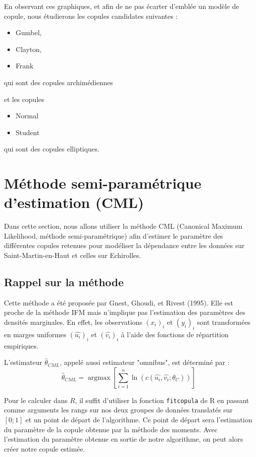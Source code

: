 En observant ces graphiques, et afin de ne pas écarter d'emblée un modèle de copule, nous étudierons les copules candidates suivantes :
\begin{itemize}
\item Gumbel,
\item Clayton,
\item Frank 
\end{itemize}
qui sont des copules archimédiennes 

et les copules
\begin{itemize} 
\item Normal
\item Student
\end{itemize}
qui sont des copules elliptiques.





\section{Méthode semi-paramétrique d'estimation (CML)}

Dans cette section, nous allons utiliser la méthode CML (Canonical Maximum Likelihood, méthode semi-paramétrique) afin d'estimer le paramètre des différentes copules retenues pour modéliser la dépendance entre les données sur Saint-Martin-en-Haut et celles sur Echirolles.

\subsection{Rappel sur la méthode}

Cette méthode a été proposée par Gnest, Ghoudi, et Rivest (1995). Elle est proche de la méthode IFM mais n'implique pas l'estimation des paramètres
des densités marginales. En effet, les observations $(x_i)_i$ et $(y_i)_i$ sont transformées en marges uniformes $(\widehat{u_i})_i$ et $(\widehat{v_i})_i$ à l'aide
des fonctions de répartition empiriques.

L'estimateur $\widehat{\theta}_{CML}$, appelé aussi estimateur "omnibus", est déterminé par :
$$
\widehat{\theta}_{CML} = \operatorname{argmax} \left[ \sum_{i=1}^n \operatorname{ln} \left(c(\widehat{u_i},\widehat{v_i};\theta_C) \right)  \right]
$$ 


Pour le calculer dans $R$, il suffit d'utiliser la fonction \lstinline!fitcopula! de R en passant comme arguments les rangs sur nos deux groupes de données translatés sur $[0;1]$ et un point de départ de l'algorithme. Ce point de départ sera l'estimation du paramètre de la copule obtenue par la méthode des moments. Avec l'estimation du paramètre obtenue en sortie de notre algorithme, on peut alors créer notre copule estimée.


